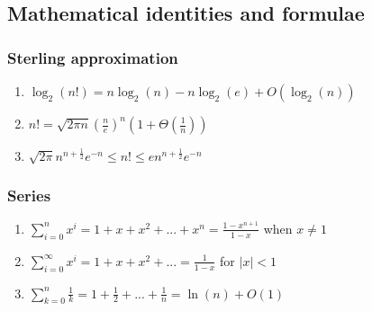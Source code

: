 \documentclass[a4paper]{article}
\begin{document}
\subsection{Mathematical identities and formulae}
\subsubsection{Sterling approximation}
\begin{enumerate}
	\item $\log_2 (n!) = n\log_2 (n) - n\log_2 (e) + O(\log_2 (n))$
	\item $n! = \sqrt{2\pi n} (\frac{n}{e})^{n}(1 + \Theta(\frac{1}{n}))$
	\item $\sqrt{2\pi}n^{n+\frac{1}{2}}e^{-n} \le n! \le en^{n+\frac{1}{2}}e^{-n}$
\end{enumerate}
\subsubsection{Series}
\begin{enumerate}
	\item $\sum_{i=0}^{n}x^{i} = 1 + x + x^{2} +... + x^{n} = \frac{1-x^{n+1}}{1-x}$ when $x\neq1$
	\item $\sum_{i=0}^{\infty}x^{i} = 1 + x + x^{2} +... = \frac{1}{1-x}$ for $|x|<1$
	\item $\sum_{k=0}^{n}\frac{1}{k} = 1 + \frac{1}{2} +... +\frac{1}{n} = \ln(n) + O(1)$
\end{enumerate}
\end{document}
